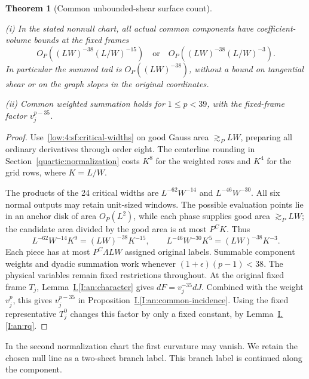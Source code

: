 \documentclass[11pt]{amsart}
\newtheorem{theorem}{Theorem}[section]
\theoremstyle{definition}
\theoremstyle{remark}
\numberwithin{equation}{section}
\newcommand{\partIref}[1]{\hyperref[I:#1]{I.\ref*{I:#1}}}
\begin{document}
\begin{theorem}[Common unbounded-shear surface count]\label{low:4:sf:thm:gauss}

\noindent\textup{(i)} In the stated nonnull chart, all actual common components have coefficient-volume bounds at the fixed frames
\[
O_P((LW)^{-38}(L/W)^{-15})
\quad\text{or}\quad
O_P((LW)^{-38}(L/W)^{-3}).
\]
In particular the summed tail is $O_P((LW)^{-38})$, without a bound on tangential shear or on the graph slopes in the original coordinates.

\noindent\textup{(ii)} Common weighted summation holds for $1\le p<39$, with the fixed-frame factor $v_j^{p-35}$.
\end{theorem}
\begin{proof}
Use~\eqref{low:4:sf:critical-widths} on good Gauss area $\gtrsim_PLW$, preparing all ordinary derivatives through order eight. The centerline rounding in Section~\ref{quartic:normalization} costs $K^8$ for the weighted rows and $K^4$ for the grid rows, where $K=L/W$.

The products of the 24 critical widths are $L^{-62}W^{-14}$ and $L^{-46}W^{-30}$. All six normal outputs may retain unit-sized windows. The possible evaluation points lie in an anchor disk of area $O_P(L^2)$, while each phase supplies good area $\gtrsim_PLW$; the candidate area divided by the good area is at most $P^CK$. Thus
\[
L^{-62}W^{-14}K^9=(LW)^{-38}K^{-15},
\qquad
L^{-46}W^{-30}K^5=(LW)^{-38}K^{-3}.
\]
Each piece has at most $P^C\Lambda LW$ assigned original labels. Summable component weights and dyadic summation work whenever $(1+\epsilon)(p-1)<38$. The physical variables remain fixed restrictions throughout. At the original fixed frame $T_j$, Lemma~\partIref{an:character} gives $dF=v_j^{-35}dJ$. Combined with the weight $v_j^p$, this gives $v_j^{p-35}$ in Proposition~\partIref{an:common-incidence}. Using the fixed representative $T_j^0$ changes this factor by only a fixed constant, by Lemma~\partIref{an:rq}.
\end{proof}

In the second normalization chart the first curvature may vanish. We retain the chosen null line as a two-sheet branch label. This branch label is continued along the component.
\end{document}
